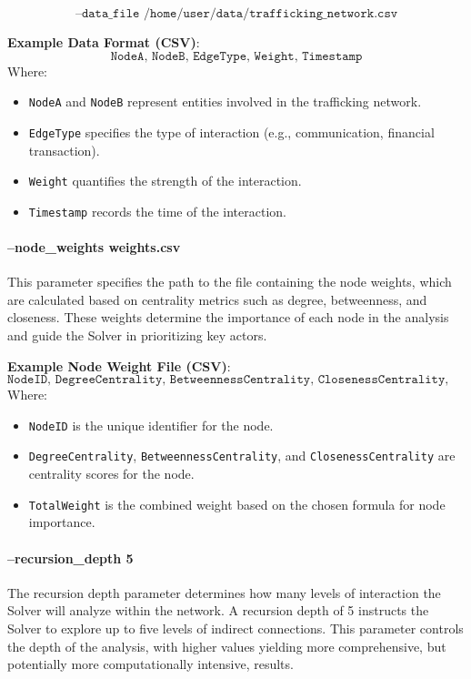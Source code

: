 \documentclass[%
 preprint, linenumbers,
 amsmath,amssymb,
 aps, physrev,
]{revtex4-2}
\begin{document}
\[
\texttt{--data\_file /home/user/data/trafficking\_network.csv}
\]

\textbf{Example Data Format (CSV)}:
\[
\texttt{NodeA, NodeB, EdgeType, Weight, Timestamp}
\]
Where:
\begin{itemize}
    \item \texttt{NodeA} and \texttt{NodeB} represent entities involved in the trafficking network.
    \item \texttt{EdgeType} specifies the type of interaction (e.g., communication, financial transaction).
    \item \texttt{Weight} quantifies the strength of the interaction.
    \item \texttt{Timestamp} records the time of the interaction.
\end{itemize}

\paragraph{--node\_weights weights.csv}
This parameter specifies the path to the file containing the node weights, which are calculated based on centrality metrics such as degree, betweenness, and closeness. These weights determine the importance of each node in the analysis and guide the Solver in prioritizing key actors.

\textbf{Example Node Weight File (CSV)}:
\[
\texttt{NodeID, DegreeCentrality, BetweennessCentrality, ClosenessCentrality, TotalWeight}
\]
Where:
\begin{itemize}
    \item \texttt{NodeID} is the unique identifier for the node.
    \item \texttt{DegreeCentrality}, \texttt{BetweennessCentrality}, and \texttt{ClosenessCentrality} are centrality scores for the node.
    \item \texttt{TotalWeight} is the combined weight based on the chosen formula for node importance.
\end{itemize}

\paragraph{--recursion\_depth 5}
The recursion depth parameter determines how many levels of interaction the Solver will analyze within the network. A recursion depth of 5 instructs the Solver to explore up to five levels of indirect connections. This parameter controls the depth of the analysis, with higher values yielding more comprehensive, but potentially more computationally intensive, results.
\end{document}
